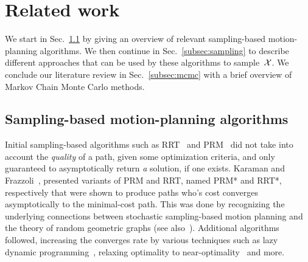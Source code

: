 \documentclass[letterpaper, 10 pt, conference]{ieeeconf}  %
\begin{document}

%


\section{Related work}
\label{sec:related_work}
We start in Sec.~\ref{subsec:planning} by giving an overview of relevant sampling-based motion-planning algorithms.
We then continue in Sec.~\ref{subsec:sampling} to describe different approaches that can be used by  these algorithms to sample~$\mathcal{X}$.
We conclude our literature review in Sec.~\ref{subsec:mcmc} with a brief overview of Markov Chain Monte Carlo methods.

\subsection{Sampling-based motion-planning algorithms}
\label{subsec:planning}
Initial sampling-based algorithms such as RRT~\cite{LK01} and PRM~\cite{KSLO96} did not take into account the \emph{quality} of a path, given some optimization criteria, and only guaranteed to asymptotically return \emph{a} solution, if one exists.
Karaman and Frazzoli~\cite{KF11}, presented variants of PRM and RRT, named PRM* and RRT*, respectively that were shown to produce paths who's cost converges asymptotically to the minimal-cost path.
This was done by recognizing the underlying connections between stochastic sampling-based motion planning and the theory of random geometric graphs (see also~\cite{SSH16}).
Additional algorithms followed, increasing the converges rate by various techniques such as 
lazy dynamic programming~\cite{GSB15, JSCP15, SH15},
relaxing optimality to near-optimality~\cite{DB14, SH16} 
and more.
\end{document}
